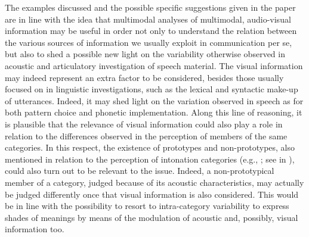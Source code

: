 \documentclass[output=paper]{langsci/langscibook}
\begin{document}
The examples discussed and the possible specific suggestions given in the paper are in line with the idea that multimodal analyses of multimodal, audio-visual information may be useful in order not only to understand the relation between the various sources of information we usually exploit in communication {per se}, but also to shed a possible new light on the variability otherwise observed in acoustic and articulatory investigation of speech material. The visual information may indeed represent an extra factor to be considered, besides those usually focused on in linguistic investigations, such as the lexical and syntactic make-up of utterances. Indeed, it may shed light on the variation observed in speech as for both pattern choice and phonetic implementation. Along this line of reasoning, it is plausible that the relevance of visual information could also play a role in relation to the differences observed in the perception of members of the same categories. In this respect, the existence of prototypes and non-prototypes, also mentioned in relation to the perception of intonation categories (e.g., \citealt{Schneider2005,SchneiderEtAl2006,Schneider2009,GiliFivela2012}; see  in ), could also turn out to be relevant to the issue. Indeed, a non-prototypical member of a category, judged because of its acoustic characteristics, may actually be judged differently once that visual information is also considered. This would be in line with the possibility to resort to intra-category variability to express shades of meanings by means of the modulation of acoustic and, possibly, visual information too.

{
\sloppy
\printbibliography[heading=subbibliography,notkeyword=this]
}
\end{document}
